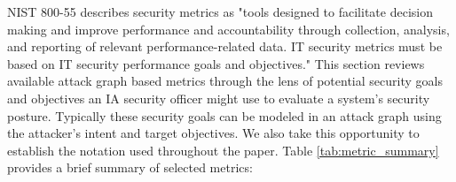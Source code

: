 NIST 800-55\cite{Swanson_Bartol_Sabato_Hash_Graffo_2003} describes security metrics as "tools designed to facilitate decision making and improve performance and accountability through collection, analysis, and reporting of relevant performance-related data. IT security metrics must be based on IT security performance goals and objectives." This section reviews available attack graph based metrics through the lens of potential security goals and objectives an IA security officer might use to evaluate a system's security posture. Typically these security goals can be modeled in an attack graph using the attacker's intent and target objectives. We also take this opportunity to establish the notation used throughout the paper. Table \ref{tab:metric_summary} provides a brief summary of selected metrics: 

\begin{table}[ht]
\caption{Metrics Summary}
\end{table}



